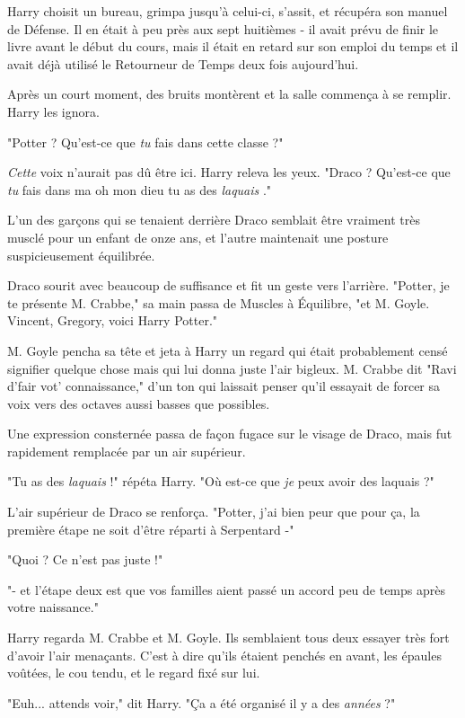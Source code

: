 Harry choisit un bureau, grimpa jusqu'à celui-ci, s'assit, et récupéra son manuel de Défense. Il en était à peu près aux sept huitièmes - il avait prévu de finir le livre avant le début du cours, mais il était en retard sur son emploi du temps et il avait déjà utilisé le Retourneur de Temps deux fois aujourd'hui.

Après un court moment, des bruits montèrent et la salle commença à se remplir. Harry les ignora.

"Potter ? Qu'est-ce que \emph{tu}  fais dans cette classe ?"

\emph{Cette}  voix n'aurait pas dû être ici. Harry releva les yeux. "Draco ? Qu'est-ce que \emph{tu}  fais dans ma oh mon dieu tu as des \emph{laquais} ."

L'un des garçons qui se tenaient derrière Draco semblait être vraiment très musclé pour un enfant de onze ans, et l'autre maintenait une posture suspicieusement équilibrée.

Draco sourit avec beaucoup de suffisance et fit un geste vers l'arrière. "Potter, je te présente M. Crabbe," sa main passa de Muscles à Équilibre, "et M. Goyle. Vincent, Gregory, voici Harry Potter."

M. Goyle pencha sa tête et jeta à Harry un regard qui était probablement censé signifier quelque chose mais qui lui donna juste l'air bigleux. M. Crabbe dit "Ravi d'fair vot' connaissance," d'un ton qui laissait penser qu'il essayait de forcer sa voix vers des octaves aussi basses que possibles.

Une expression consternée passa de façon fugace sur le visage de Draco, mais fut rapidement remplacée par un air supérieur.

"Tu as des \emph{laquais}  !" répéta Harry. "Où est-ce que \emph{je}  peux avoir des laquais ?"

L'air supérieur de Draco se renforça. "Potter, j'ai bien peur que pour ça, la première étape ne soit d'être réparti à Serpentard -"

"Quoi ? Ce n'est pas juste !"

"- et l'étape deux est que vos familles aient passé un accord peu de temps après votre naissance."

Harry regarda M. Crabbe et M. Goyle. Ils semblaient tous deux essayer très fort d'avoir l'air menaçants. C'est à dire qu'ils étaient penchés en avant, les épaules voûtées, le cou tendu, et le regard fixé sur lui.

"Euh... attends voir," dit Harry. "Ça a été organisé il y a des \emph{années}  ?"


